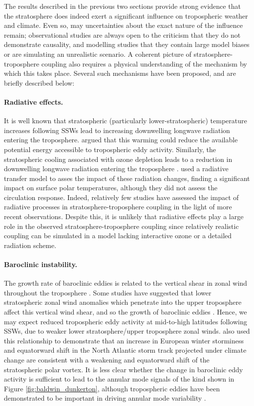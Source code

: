 The results described in the previous two sections provide strong evidence that
the stratosphere does indeed exert a significant influence on tropospheric
weather and climate. Even so, may uncertainties about the exact nature of the
influence remain; observational studies are always open to the criticism that
they do not demonstrate causality, and modelling studies that they contain large
model biases or are simulating an unrealistic scenario. A coherent picture of
stratosphere-troposphere coupling also requires a physical understanding of the
mechanism by which this takes place. Several such mechanisms have been proposed,
and are briefly described below:


\paragraph{Radiative effects.} It is well known that stratospheric (particularly
lower-stratospheric) temperature increases following SSWs lead to increasing
downwelling longwave radiation entering the troposphere.  \citet{Ramanathan1977}
argued that this warming could reduce the available potential energy accessible
to tropospheric eddy activity. Similarly, the stratospheric cooling associated
with ozone depletion leads to a reduction in downwelling longwave radiation
entering the troposphere \citep{Forster1997a}. \citet{Grise2009} used a
radiative transfer model to asses the impact of these radiation changes, finding
a significant impact on surface polar temperatures, although they did not assess
the circulation response. Indeed, relatively few studies have assessed the
impact of radiative processes in stratosphere-troposphere coupling in the light
of more recent observations. Despite this, it is unlikely that radiative effects
play a large role in the observed stratosphere-troposphere coupling since
relatively realistic coupling can be simulated in a model lacking interactive
ozone or a detailed radiation scheme.

\paragraph{Baroclinic instability.} The growth rate of baroclinic eddies is
related to the vertical shear in zonal wind throughout the troposphere
\citep{Eady1949}. Some studies have suggested that lower stratospheric zonal
wind anomalies which penetrate into the upper troposphere affect this vertical
wind shear, and so the growth of baroclinic eddies \citep{Wittman2007,
  Chen2008}. Hence, we may expect reduced tropospheric eddy activity at
mid-to-high latitudes following SSWs, due to weaker lower stratosphere/upper
troposphere zonal winds. \citet{Scaife2011} also used this relationship to
demonstrate that an increase in European winter storminess and equatorward shift
in the North Atlantic storm track projected under climate change are consistent
with a weakening and equatorward shift of the stratospheric polar vortex. It is
less clear whether the change in baroclinic eddy activity is sufficient to lead
to the annular mode signals of the kind shown in Figure
\ref{fig:baldwin_dunkerton}, although tropospheric eddies have been demonstrated
to be important in driving annular mode variability \citep{Limpasuvan1999}.

